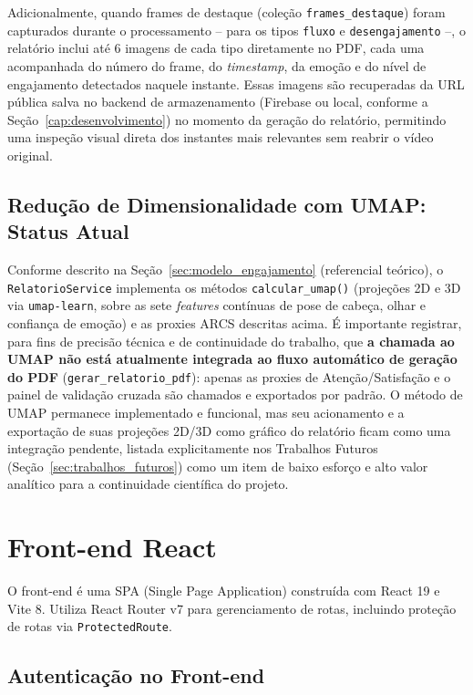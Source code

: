 \documentclass[
	12pt,
	openright,
	oneside,
	a4paper,
	english,
	brazil
	]{abntex2}
\begin{document}
Adicionalmente, quando frames de destaque (coleção \texttt{frames\_destaque}) foram capturados durante o processamento -- para os tipos \texttt{fluxo} e \texttt{desengajamento} --, o relatório inclui até 6 imagens de cada tipo diretamente no PDF, cada uma acompanhada do número do frame, do \textit{timestamp}, da emoção e do nível de engajamento detectados naquele instante. Essas imagens são recuperadas da URL pública salva no backend de armazenamento (Firebase ou local, conforme a Seção~\ref{cap:desenvolvimento}) no momento da geração do relatório, permitindo uma inspeção visual direta dos instantes mais relevantes sem reabrir o vídeo original.

\subsection{Redução de Dimensionalidade com UMAP: Status Atual}

Conforme descrito na Seção~\ref{sec:modelo_engajamento} (referencial teórico), o \texttt{RelatorioService} implementa os métodos \texttt{calcular\_umap()} (projeções 2D e 3D via \texttt{umap-learn}, sobre as sete \textit{features} contínuas de pose de cabeça, olhar e confiança de emoção) e as proxies ARCS descritas acima. É importante registrar, para fins de precisão técnica e de continuidade do trabalho, que \textbf{a chamada ao UMAP não está atualmente integrada ao fluxo automático de geração do PDF} (\texttt{gerar\_relatorio\_pdf}): apenas as proxies de Atenção/Satisfação e o painel de validação cruzada são chamados e exportados por padrão. O método de UMAP permanece implementado e funcional, mas seu acionamento e a exportação de suas projeções 2D/3D como gráfico do relatório ficam como uma integração pendente, listada explicitamente nos Trabalhos Futuros (Seção~\ref{sec:trabalhos_futuros}) como um item de baixo esforço e alto valor analítico para a continuidade científica do projeto.

\section{Front-end React}

O front-end é uma SPA (Single Page Application) construída com React 19 e Vite 8. Utiliza React Router v7 para gerenciamento de rotas, incluindo proteção de rotas via \texttt{ProtectedRoute}.

\subsection{Autenticação no Front-end}
\end{document}
